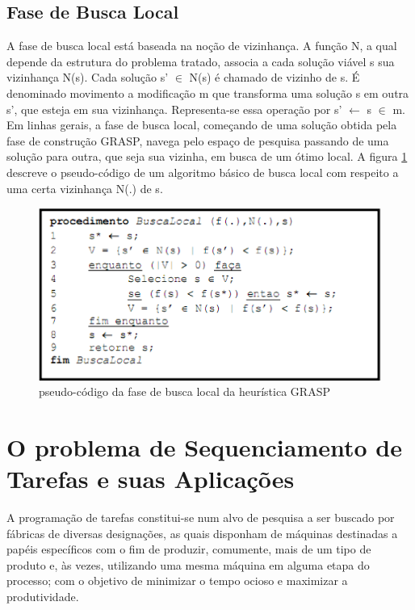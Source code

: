 \subsection{Fase de Busca Local}
A fase de busca local está baseada na noção de vizinhança. A função N, a qual depende da estrutura do problema tratado, associa a cada solução viável s sua vizinhança N(s). Cada solução s' $\in$ N(s) é chamado de vizinho de s. É denominado movimento a modificação m que transforma uma solução s em outra s’, que esteja em sua vizinhança. Representa-se essa operação por s' $\leftarrow$ s $\in$ m. 
Em linhas gerais, a fase de busca local, começando de uma solução obtida pela fase de construção GRASP, navega pelo espaço de pesquisa passando de uma solução para outra, que seja sua vizinha, em busca de um ótimo local. 
A figura \ref{local_search_phase} descreve o pseudo-código de um algoritmo básico de busca local com respeito a uma certa vizinhança N(.) de s.

\begin{figure}[H]
	\centering
	\includegraphics[scale=0.6]{graficos/grasp_local_search_phase.eps}
	\caption{pseudo-código da fase de busca local da heurística GRASP}
	\label{local_search_phase}
\end{figure}

\section{O problema de Sequenciamento de Tarefas e suas Aplicações}
A programação de tarefas constitui-se num alvo de pesquisa a ser buscado por fábricas de diversas designações, as quais disponham de máquinas destinadas a papéis específicos com o fim de produzir, comumente, mais de um tipo de produto e, às vezes, utilizando uma mesma máquina em alguma etapa do processo; com o objetivo de minimizar o tempo ocioso e maximizar a produtividade.

